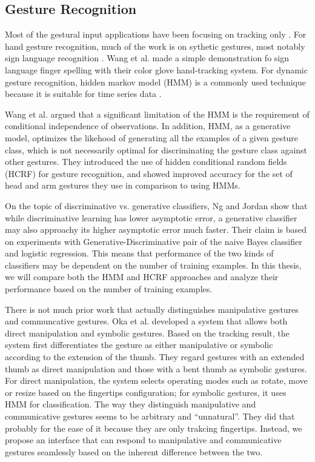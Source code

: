 \subsection{Gesture Recognition}
Most of the gestural input applications have been focusing on tracking only
\cite{harrison11} \cite{larson11}. For hand gesture recognition, much of the
work is on sythetic gestures, most notably sign language recognition
\cite{Bauer00} \cite{kadous02}. Wang et al. \cite{Wang09} made a simple
demonstration fo sign language finger spelling with their color glove hand-tracking system. 
For dynamic gesture recognition, hidden markov model (HMM) is a commonly used
technique because it is suitable for time series data \cite{sharma00}. 

Wang et al. \cite{wang06} argued that a significant limitation of the
HMM is the requirement of conditional independence of observations. In
addition, HMM, as a generative model, optimizes the likehood of
generating all the examples of a given gesture class, which is not
necessarily optimal for discriminating the gesture class against other
gestures. They introduced the use of hidden conditional random fields (HCRF) for
gesture recognition, and showed improved accuracy for the set of head and
arm gestures they use in comparison to using HMMs. 

On the topic of discriminative vs. generative classifiers, Ng and Jordan
\cite{ng02} show that while discriminative learning has lower asymptotic error,
a generative classifier may also approachy its higher asymptotic error much
faster. Their claim is based on experiments with Generative-Discriminative
pair of the naive Bayes classifier and logistic regression. This means that
performance of the two kinds of classifiers may be dependent on the number of training
examples. In this thesis, we will compare both the HMM and HCRF approaches and
analyze their performance based on the number of training examples.

There is not much prior work that actually distinguishes manipulative gestures
and communcative gestures. Oka et al. \cite{Oka02} developed a system that allows
both direct manipulation and symbolic gestures. Based on the tracking result,
the system first differentiates the gesture as either manipulative or symbolic 
according to the extension of the thumb. They regard gestures with an extended 
thumb as direct manipulation and those with a bent thumb as symbolic gestures. 
For direct manipulation, the system selects operating modes such as rotate, 
move or resize based on the fingertips configuration; for symbolic gestures, it 
uses HMM for classification. The way they distinguish manipulative and 
communicative gestures seems to be arbitrary and ``unnatural''. They did that 
probably for the ease of it because they are only trakcing fingertips.
Instead, we propose an interface that can respond to manipulative and
communicative gestures seamlessly based on the inherent difference between the two.

